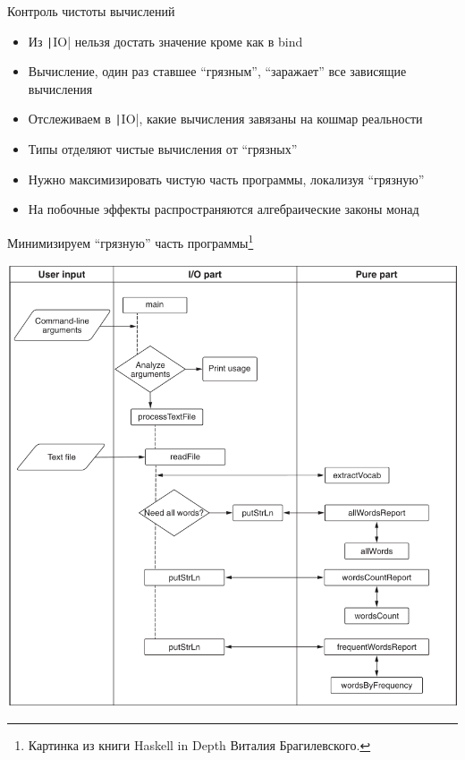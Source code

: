     \begin{frame}[fragile]{Контроль чистоты вычислений}
        \vspace{-0.5em}
        \begin{itemize}
            \item Из \texttt|IO| нельзя достать значение кроме как в bind
            \item Вычисление, один раз ставшее ``грязным'', ``заражает'' все зависящие вычисления
            \item Отслеживаем в \texttt|IO|, какие вычисления завязаны на кошмар реальности
            \item[\positive] Типы отделяют чистые вычисления от ``грязных''
            \item[\positive] Нужно максимизировать чистую часть программы, локализуя ``грязную''
            \item[\positive] На побочные эффекты распространяются алгебраические законы монад
        \end{itemize}
    \end{frame}

    \begin{frame}[fragile]{Минимизируем ``грязную'' часть программы\footnote{Картинка из книги Haskell in Depth Виталия Брагилевского.}}
        \vspace{-0.5em}
        \begin{center}
            \includegraphics[height=0.8\textheight]{figs/pure}
        \end{center}
    \end{frame}

